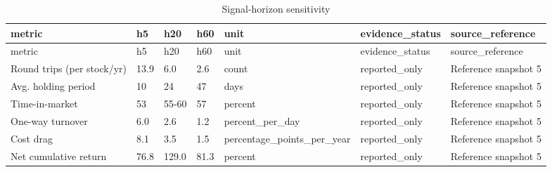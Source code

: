 \begin{landscape}
\begin{longtable}{lllllll}
\caption{Signal-horizon sensitivity}\label{tab:evaluation_5} \\
\toprule
metric & h5 & h20 & h60 & unit & evidence\_status & source\_reference \\
\midrule
\endfirsthead
\toprule
metric & h5 & h20 & h60 & unit & evidence\_status & source\_reference \\
\midrule
\endhead
Round trips (per stock/yr) & 13.9 & 6.0 & 2.6 & count & reported\_only & Reference snapshot 5 \\
Avg. holding period & 10 & 24 & 47 & days & reported\_only & Reference snapshot 5 \\
Time-in-market & 53 & 55-60 & 57 & percent & reported\_only & Reference snapshot 5 \\
One-way turnover & 6.0 & 2.6 & 1.2 & percent\_per\_day & reported\_only & Reference snapshot 5 \\
Cost drag & 8.1 & 3.5 & 1.5 & percentage\_points\_per\_year & reported\_only & Reference snapshot 5 \\
Net cumulative return & 76.8 & 129.0 & 81.3 & percent & reported\_only & Reference snapshot 5 \\
\bottomrule
\end{longtable}
\end{landscape}
